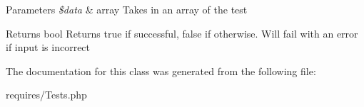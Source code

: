 \begin{DoxyParams}{Parameters}
{\em \$data} & array Takes in an array of the test\\
\hline
\end{DoxyParams}
\begin{DoxyReturn}{Returns}
bool Returns true if successful, false if otherwise. Will fail with an error if input is incorrect 
\end{DoxyReturn}


The documentation for this class was generated from the following file\-:\begin{DoxyCompactItemize}
\item 
requires/Tests.\-php\end{DoxyCompactItemize}

